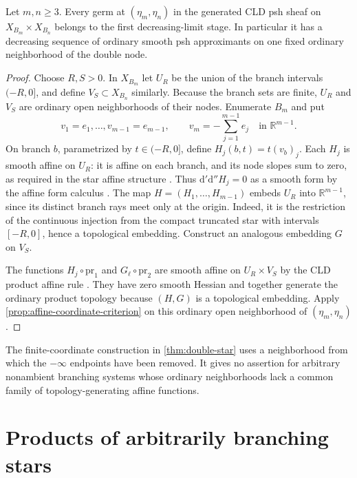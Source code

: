\documentclass[11pt,a4paper]{amsart}
\begin{document}
\begin{theorem}
\label{thm:double-star}
Let $m,n\geq3$. Every germ at $(\eta_m,\eta_n)$ in the generated CLD psh sheaf on $X_{B_m}\times X_{B_n}$ belongs to the first decreasing-limit stage. In particular it has a decreasing sequence of ordinary smooth psh approximants on one fixed ordinary neighborhood of the double node.
\end{theorem}

\begin{proof}
Choose $R,S>0$. In $X_{B_m}$ let $U_R$ be the union of the branch intervals $(-R,0]$, and define $V_S\subset X_{B_n}$ similarly. Because the branch sets are finite, $U_R$ and $V_S$ are ordinary open neighborhoods of their nodes. Enumerate $B_m$ and put
\[
v_1=e_1,\ldots,v_{m-1}=e_{m-1},\qquad v_m=-\sum_{j=1}^{m-1}e_j
\quad\text{in }\mathbb{R}^{m-1}.
\]
On branch $b$, parametrized by $t\in(-R,0]$, define $H_j(b,t)=t(v_b)_j$. Each $H_j$ is smooth affine on $U_R$: it is affine on each branch, and its node slopes sum to zero, as required in the star affine structure \cite[\S6.7.3]{CLD12}. Thus $\mathrm{d}'\mathrm{d}''H_j=0$ as a smooth form by the affine form calculus \cite[\S3.3.11]{CLD12}. The map $H=(H_1,\ldots,H_{m-1})$ embeds $U_R$ into $\mathbb{R}^{m-1}$, since its distinct branch rays meet only at the origin. Indeed, it is the restriction of the continuous injection from the compact truncated star with intervals $[-R,0]$, hence a topological embedding. Construct an analogous embedding $G$ on $V_S$.

The functions $H_j\circ\mathrm{pr}_1$ and $G_\ell\circ\mathrm{pr}_2$ are smooth affine on $U_R\times V_S$ by the CLD product affine rule \cite[\S9.1.4]{CLD12}. They have zero smooth Hessian and together generate the ordinary product topology because $(H,G)$ is a topological embedding. Apply \cref{prop:affine-coordinate-criterion} on this ordinary open neighborhood of $(\eta_m,\eta_n)$.
\end{proof}

The finite-coordinate construction in \cref{thm:double-star} uses a neighborhood from which the $-\infty$ endpoints have been removed. It gives no assertion for arbitrary nonambient branching systems whose ordinary neighborhoods lack a common family of topology-generating affine functions.

\section{Products of arbitrarily branching stars}
\label{sec:arbitrary-star-products}
\end{document}
